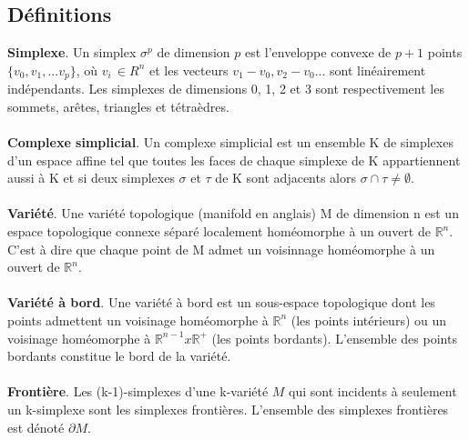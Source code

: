 \documentclass[a4paper,11pt,openany]{article}
\begin{document}
\subsection{Définitions}
\noindent
\textbf{Simplexe}. Un simplex $\sigma^p$ de dimension $p$ est l'enveloppe convexe de $p+1$ points $\{v_0,v_1,...v_p\}$, où $v_i\, \in R^n$ et les vecteurs $v_1-v_0,v_2-v_0...$ sont linéairement indépendants. Les simplexes de dimensions 0, 1, 2 et 3 sont respectivement les sommets, arêtes, triangles et tétraèdres.\\\\
\textbf{Complexe simplicial}. Un complexe simplicial est un ensemble K de simplexes d'un espace affine tel que toutes les faces de chaque simplexe de K appartiennent aussi à K et si deux simplexes $\sigma$ et $\tau$ de K sont adjacents alors $\sigma \cap \tau \neq \emptyset$.\\\\
\textbf{Variété}. Une variété topologique (manifold en anglais) M de dimension n est un espace topologique connexe séparé localement homéomorphe à un ouvert de $\mathbb{R}^n$. C'est à dire que chaque point de M admet un voisinnage homéomorphe à un ouvert de $\mathbb{R}^n$.\\\\
\textbf{Variété à bord}. Une variété à bord est un sous-espace topologique dont les points admettent un voisinage homéomorphe à $\mathbb{R}^n$ (les points intérieurs) ou un voisinage homéomorphe à $\mathbb{R}^{n-1}  x \mathbb{R}^+$ (les points bordants). L'ensemble des points bordants constitue le bord de la variété.\\\\
\textbf{Frontière}. Les (k-1)-simplexes d'une k-variété $M$ qui sont incidents à seulement un k-simplexe sont les simplexes frontières. L'ensemble des simplexes frontières est dénoté $\partial M$.\\\\
\end{document}
